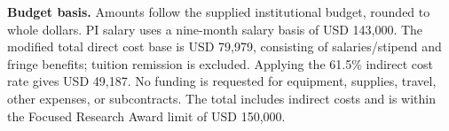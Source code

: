 \documentclass[11pt,letterpaper]{article}
\begin{document}
\textbf{Budget basis.} Amounts follow the supplied institutional budget, rounded to whole dollars. PI salary uses a nine-month salary basis of USD 143,000. The modified total direct cost base is USD 79,979, consisting of salaries/stipend and fringe benefits; tuition remission is excluded. Applying the 61.5\% indirect cost rate gives USD 49,187. No funding is requested for equipment, supplies, travel, other expenses, or subcontracts. The total includes indirect costs and is within the Focused Research Award limit of USD 150,000.
\end{document}
